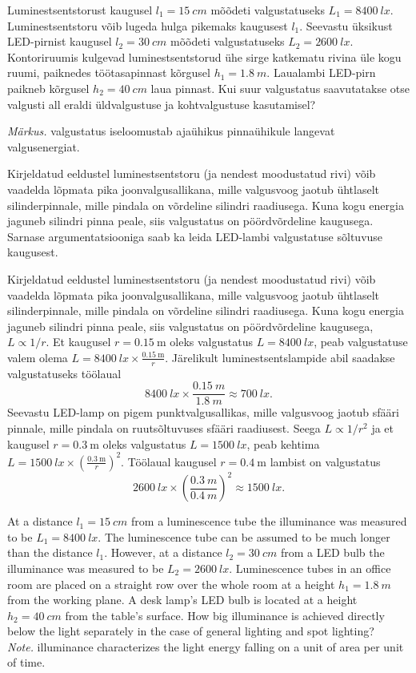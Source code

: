 
Luminestsentstorust kaugusel $l_1=\SI{15}{cm}$ mõõdeti valgustatuseks $L_1=\SI{8400}{lx}$. Luminestsentstoru võib lugeda hulga pikemaks kaugusest $l_1$. Seevastu üksikust LED-pirnist kaugusel $l_2=\SI{30}{cm}$ mõõdeti valgustatuseks $L_2=\SI{2600}{lx}$. Kontoriruumis kulgevad luminestsentstorud ühe sirge katkematu rivina üle kogu ruumi, paiknedes töötasapinnast kõrgusel $h_1=\SI{1.8}{m}$. Laualambi LED-pirn paikneb kõrgusel $h_2=\SI{40}{cm}$ laua pinnast. Kui suur valgustatus saavutatakse otse valgusti all eraldi üldvalgustuse ja kohtvalgustuse kasutamisel? 

\emph{Märkus.} valgustatus iseloomustab ajaühikus pinnaühikule langevat valgusenergiat.

\hint
Kirjeldatud eeldustel luminestsentstoru (ja nendest moodustatud rivi) võib vaadelda lõpmata pika joonvalgusallikana, mille valgusvoog jaotub ühtlaselt silinderpinnale, mille pindala on võrdeline silindri raadiusega. Kuna kogu energia jaguneb silindri pinna peale, siis valgustatus on pöördvõrdeline kaugusega. Sarnase argumentatsiooniga saab ka leida LED-lambi valgustatuse sõltuvuse kaugusest.

\solu
Kirjeldatud eeldustel luminestsentstoru (ja nendest moodustatud rivi) võib vaadelda lõpmata pika joonvalgusallikana, mille valgusvoog jaotub ühtlaselt silinderpinnale, mille pindala on võrdeline silindri raadiusega. Kuna kogu energia jaguneb silindri pinna peale, siis valgustatus on pöördvõrdeline kaugusega, $L \propto 1/r$. Et kaugusel $r=\SI{0.15}{\meter}$ oleks valgustatus $L=\SI{8400}{lx}$, peab valgustatuse valem olema $L=\SI{8400}{lx}\times \frac{\SI{0.15}{\meter}} r$. Järelikult luminestsentslampide abil saadakse valgustatuseks töölaual
\[
\SI{8400}{lx}\times\frac{\SI{0.15}{m}}{\SI{1.8}{m}}\approx\SI{700}{lx}.
\]
Seevastu LED-lamp on pigem punktvalgusallikas, mille valgusvoog jaotub sfääri pinnale, mille pindala on ruutsõltuvuses sfääri raadiusest. Seega $L \propto 1/r^2$ ja et kaugusel $r=\SI{0.3}{\meter}$ oleks valgustatus $L=\SI{1500}{lx}$, peab kehtima $L=\SI{1500}{lx}\times \left(\frac{\SI{0.3}{\meter}} {r}\right)^2$. Töölaual kaugusel $r=\SI{0.4}{\meter}$ lambist on valgustatus
\[
\SI{2600}{lx}\times\left(\frac{\SI{0.3}{m}}{\SI{0.4}{m}}\right)^2\approx\SI{1500}{lx}.
\]

At a distance $l_1=\SI{15}{cm}$ from a luminescence tube the illuminance was measured to be $L_1=\SI{8400}{lx}$. The luminescence tube can be assumed to be much longer than the distance $l_1$. However, at a distance $l_2=\SI{30}{cm}$ from a LED bulb the illuminance was measured to be $L_2=\SI{2600}{lx}$. Luminescence tubes in an office room are placed on a straight row over the whole room at a height $h_1=\SI{1.8}{m}$ from the working plane. A desk lamp’s LED bulb is located at a height $h_2=\SI{40}{cm}$ from the table’s surface. How big illuminance is achieved directly below the light separately in the case of general lighting and spot lighting?\\
\emph{Note.} illuminance characterizes the light energy falling on a unit of area per unit of time.

